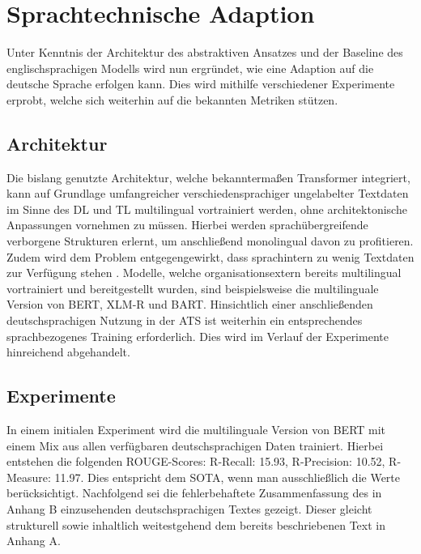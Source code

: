 \chapter{Sprachtechnische Adaption}
\thispagestyle{fancy}
\label{chap:Sprachtechnische Adaption}

\noindent
Unter Kenntnis der Architektur des abstraktiven Ansatzes und der Baseline des englischsprachigen Modells wird nun ergründet, wie eine Adaption auf die deutsche Sprache erfolgen kann. Dies wird mithilfe verschiedener Experimente erprobt, welche sich weiterhin auf die bekannten Metriken stützen.


\section{Architektur}
\noindent
Die bislang genutzte Architektur, welche bekanntermaßen Transformer integriert, kann auf Grundlage umfangreicher verschiedensprachiger ungelabelter Textdaten im Sinne des \ac{DL} und \ac{TL} multilingual vortrainiert werden, ohne architektonische Anpassungen vornehmen zu müssen. Hierbei werden sprachübergreifende verborgene Strukturen erlernt, um anschließend monolingual davon zu profitieren. Zudem wird dem Problem entgegengewirkt, dass sprachintern zu wenig Textdaten zur Verfügung stehen \cite{MOB20}. Modelle, welche organisationsextern bereits multilingual vortrainiert und bereitgestellt wurden, sind beispielsweise die multilinguale Version von \ac{BERT}, \ac{XLM-R} und \ac{BART}. Hinsichtlich einer anschließenden deutschsprachigen Nutzung in der \ac{ATS} ist weiterhin ein entsprechendes sprachbezogenes Training erforderlich. Dies wird im Verlauf der Experimente hinreichend abgehandelt.


\section{Experimente}
\noindent
In einem initialen Experiment wird die multilinguale Version von \ac{BERT} mit einem Mix aus allen verfügbaren deutschsprachigen Daten trainiert. Hierbei entstehen die folgenden \ac{ROUGE}-Scores: R-Recall: 15.93, R-Precision: 10.52, R-Measure: 11.97. Dies entspricht dem \ac{SOTA}, wenn man ausschließlich die Werte berücksichtigt. Nachfolgend sei die fehlerbehaftete Zusammenfassung des in Anhang B einzusehenden deutschsprachigen Textes gezeigt. Dieser gleicht strukturell sowie inhaltlich weitestgehend dem bereits beschriebenen Text in Anhang A.\\

